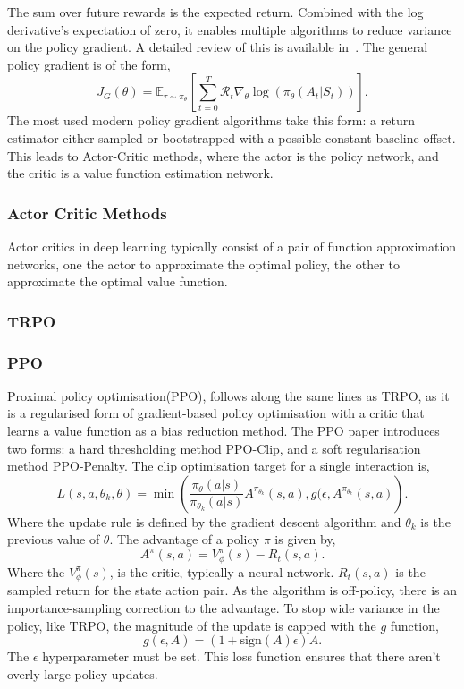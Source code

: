 The sum over future rewards is the expected return. Combined with the log derivative's expectation of zero, it enables multiple algorithms to reduce variance on the policy gradient. A detailed review of this is available in~\cite{generalised_advantage}. The general policy gradient is of the form,
\begin{equation}
	J_G(\theta)  = \mathbb{E}_{\tau \sim \pi_\theta} \left[\sum_{t=0} ^ T \mathcal{R}_t \nabla_\theta \log(\pi_\theta(A_t|S_t))\right].
\end{equation}
The most used modern policy gradient algorithms take this form: a return estimator either sampled or bootstrapped with a possible constant baseline offset. This leads to Actor-Critic methods, where the actor is the policy network, and the critic is a value function estimation network.

\subsubsection{Actor Critic Methods}
Actor critics in deep learning typically consist of a pair of function approximation networks, one the actor to approximate the optimal policy, the other to approximate the optimal value function.
\subsubsection{TRPO}
\subsubsection{PPO}
Proximal policy optimisation(PPO), follows along the same lines as TRPO, as it is a regularised form of gradient-based policy optimisation with a critic that learns a value function as a bias reduction method. The PPO paper introduces two forms: a hard thresholding method PPO-Clip, and a soft regularisation method PPO-Penalty. The clip optimisation target for a single interaction is,
\begin{equation}
	L(s, a, \theta_k, \theta) = \min \left(\frac{\pi_\theta(a|s)}{\pi_{\theta_k}(a|s)} A^{\pi_{\theta_k}}(s,a), g(\epsilon, A^{\pi_{\theta_k}}(s, a) \right).
\end{equation}
Where the update rule is defined by the gradient descent algorithm and $\theta_k$ is the previous value of $\theta$. The advantage of a policy $\pi$ is given by,
\begin{equation}
	A^{\pi}(s, a) = V^\pi _\phi(s) - R_t(s, a).
\end{equation}
Where the $V^\pi _ \phi(s)$, is the critic, typically a neural network. $R_t(s, a)$ is the sampled return for the state action pair. As the algorithm is off-policy, there is an importance-sampling correction to the advantage. To stop wide variance in the policy, like TRPO, the magnitude of the update is capped with the $g$ function,
\begin{equation}
	g(\epsilon, A) = (1 + \text{sign}(A)\epsilon)A.
\end{equation}
The $\epsilon$ hyperparameter must be set. This loss function ensures that there aren't overly large policy updates.


